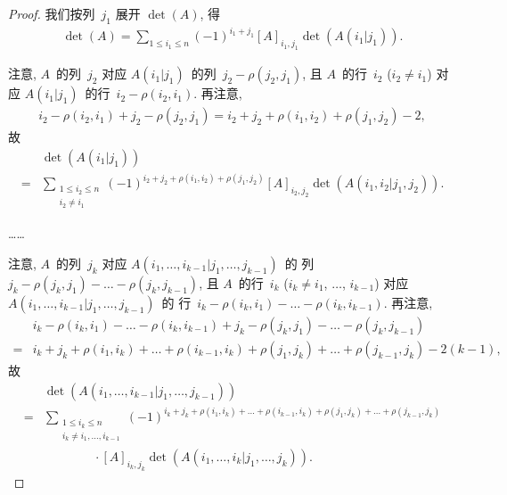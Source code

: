 \documentclass[../libro.tex]{subfiles}
\begin{document}
\begin{proof}
    我们按列~\(j_1\) 展开 \(\det {(A)}\),
    得
    \begin{align*}
        \det {(A)}
        = \sum_{1 \leq i_1 \leq n}
        {(-1)^{i_1 + j_1} [A]_{i_1,j_1} \det {(A(i_1|j_1))}}.
    \end{align*}

    注意, \(A\)~的列~\(j_2\) 对应
    \(A(i_1|j_1)\)~的列~\(j_2 - \rho(j_2, j_1)\),
    且 \(A\)~的行~\(i_2\) (\(i_2 \neq i_1\)) 对应
    \(A(i_1|j_1)\)~的行~\(i_2 - \rho(i_2, i_1)\).
    再注意,
    \begin{align*}
        i_2 - \rho(i_2, i_1) + j_2 - \rho(j_2, j_1)
        = i_2 + j_2 + \rho(i_1, i_2) + \rho(j_1, j_2) - 2,
    \end{align*}
    故
    \begin{align*}
        &
        \det {(A(i_1|j_1))}
        \\
        = {} &
        \sum_{\substack{
                1 \leq i_2 \leq n \\
                i_2 \neq i_1
        }}
        {(-1)^{i_2 + j_2 + \rho(i_1, i_2) + \rho(j_1, j_2)}
        [A]_{i_2,j_2} \det {(A({i_1,i_2}|{j_1,j_2}))}}.
    \end{align*}

    ……

    注意, \(A\)~的列~\(j_k\) 对应
    \(A({i_1,\dots,i_{k-1}}|{j_1,\dots,j_{k-1}})\)~的%
    列~\(j_k - \rho(j_k, j_1) - \dots - \rho(j_k, j_{k-1})\),
    且 \(A\)~的行~\(i_k\)
    (\(i_k \neq i_1\), \(\dots\), \(i_{k-1}\)) 对应
    \(A({i_1,\dots,i_{k-1}}|{j_1,\dots,j_{k-1}})\)~的%
    行~\(i_k - \rho(i_k, i_1) - \dots - \rho(i_k, i_{k-1})\).
    再注意,
    \begin{align*}
        &
        i_k - \rho(i_k, i_1) - \dots - \rho(i_k, i_{k-1})
        + j_k - \rho(j_k, j_1) - \dots - \rho(j_k, j_{k-1})
        \\
        = {} &
        i_k + j_k
        + \rho(i_1, i_k) + \dots + \rho(i_{k-1}, i_k)
        + \rho(j_1, j_k) + \dots + \rho(j_{k-1}, j_k)
        - 2(k-1),
    \end{align*}
    故
    \begin{align*}
        &
        \det {(A({i_1,\dots,i_{k-1}}|{j_1,\dots,j_{k-1}}))}
        \\
        = {} &
        \sum_{\substack{
                1 \leq i_k \leq n \\
                i_k \neq i_1, \dots, i_{k-1}
        }}
        {(-1)^{i_k + j_k
                + \rho(i_1, i_k) + \dots + \rho(i_{k-1}, i_k)
                + \rho(j_1, j_k) + \dots
        + \rho(j_{k-1}, j_k)}}
        \\
        &
        \qquad \qquad
        \cdot
        [A]_{i_k,j_k}
        \det {(A({i_1,\dots,i_{k}}|{j_1,\dots,j_{k}}))}.
    \end{align*}


\end{proof}
\end{document}
